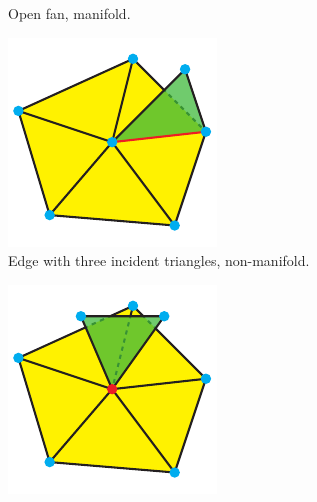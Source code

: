 \begin{description}
\begin{figure}[h]
\begin{subfigure}[b]{0.4\textwidth}
			\caption{Open fan, manifold.}
			\label{fig:open_fan}
		\end{subfigure}
		\begin{subfigure}[b]{0.3\textwidth}
			\includegraphics[width=\textwidth]{images/non_manifold_edge}
			\caption{Edge with three incident triangles, non-manifold.}
			\label{fig:non_manifold_edge}
		\end{subfigure}
		\begin{subfigure}[b]{0.3\textwidth}
			\includegraphics[width=\textwidth]{images/non_manifold_vertex}

\end{subfigure}
\end{figure}
\end{description}
